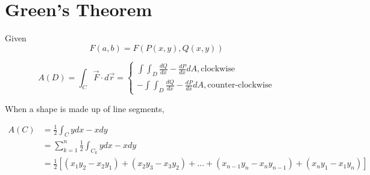\section{Green's Theorem}

  Given
  \begin{displaymath}
    F\left( a, b \right) = F\left( P\left( x, y \right), Q\left( x, y \right) \right)
  \end{displaymath}

  \begin{equation}
    A\left( D \right) = \int_{C} \vec{F} \cdot d\vec{r} =
    \begin{cases}
      \int \int_{D} \frac{dQ}{dx} - \frac{dP}{dx} dA, \text{clockwise} \\
      - \int \int_{D} \frac{dQ}{dx} - \frac{dP}{dx} dA, \text{counter-clockwise}
    \end{cases}
  \end{equation}

  When a shape is made up of line segments,

  \begin{align}
    A\left( C \right) &= \frac{1}{2} \int_{C} y dx - x dy \\
    &= \sum_{k = 1}^{n} \frac{1}{2} \int_{C_{k}} y dx - x dy \\
    &= \frac{1}{2}
    \left[
      \left( x_{1} y_{2} - x_{2} y_{1} \right) +
      \left( x_{2} y_{3} - x_{3} y_{2} \right) +
      ... +
      \left( x_{n - 1} y_{n} - x_{n} y_{n - 1} \right) +
      \left( x_{n} y_{1} - x_{1} y_{n} \right)
    \right]
  \end{align}